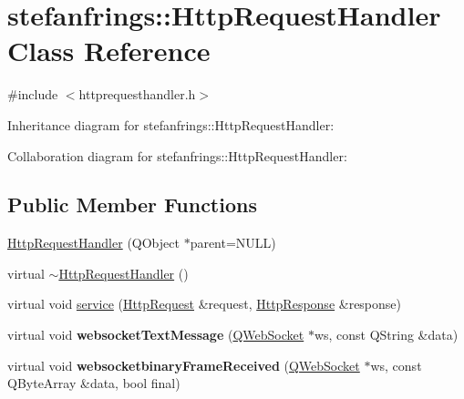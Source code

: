 \hypertarget{classstefanfrings_1_1_http_request_handler}{}\section{stefanfrings\+:\+:Http\+Request\+Handler Class Reference}
\label{classstefanfrings_1_1_http_request_handler}


{\ttfamily \#include $<$httprequesthandler.\+h$>$}



Inheritance diagram for stefanfrings\+:\+:Http\+Request\+Handler\+:


Collaboration diagram for stefanfrings\+:\+:Http\+Request\+Handler\+:
\subsection*{Public Member Functions}
\begin{DoxyCompactItemize}
\item 
\mbox{\hyperlink{classstefanfrings_1_1_http_request_handler_a0d51594412d728dd446b0ff2d1ffb112}{Http\+Request\+Handler}} (Q\+Object $\ast$parent=N\+U\+LL)
\item 
virtual \mbox{\hyperlink{classstefanfrings_1_1_http_request_handler_a32bf6b0e36dbdb4cd0525d2c4b54fdec}{$\sim$\+Http\+Request\+Handler}} ()
\item 
virtual void \mbox{\hyperlink{classstefanfrings_1_1_http_request_handler_a0a7210907152c46b8b5a47feb64cf6bd}{service}} (\mbox{\hyperlink{classstefanfrings_1_1_http_request}{Http\+Request}} \&request, \mbox{\hyperlink{classstefanfrings_1_1_http_response}{Http\+Response}} \&response)
\item 
\mbox{\label{classstefanfrings_1_1_http_request_handler_a6f99eefd2408be25b6cd00cae964173e}} 
virtual void {\bfseries websocket\+Text\+Message} (\mbox{\hyperlink{class_q_web_socket}{Q\+Web\+Socket}} $\ast$ws, const Q\+String \&data)
\item 
\mbox{\label{classstefanfrings_1_1_http_request_handler_a31b70b27a16beb5ec22e30bf54588926}} 
virtual void {\bfseries websocketbinary\+Frame\+Received} (\mbox{\hyperlink{class_q_web_socket}{Q\+Web\+Socket}} $\ast$ws, const Q\+Byte\+Array \&data, bool final)
\end{DoxyCompactItemize}


